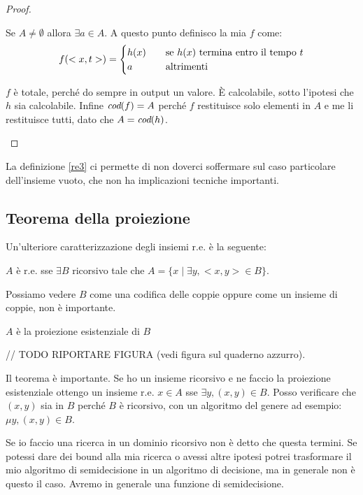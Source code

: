 \begin{proof}
\begin{itemize}
        Se $A \not= \emptyset$ allora $\exists a \in A$. A questo punto definisco la mia $f$ come:
        \begin{equation*}
            f(<x,t>) = 
            \begin{cases}
                h(x) \quad &\text{se $h(x)$ termina entro il tempo $t$}\\
                a \quad &\text{altrimenti}
            \end{cases}
        \end{equation*}

        $f$ è totale, perché do sempre in output un valore. È calcolabile, sotto l'ipotesi che $h$
        sia calcolabile. Infine $\textit{cod}(f) = A$ perché $f$ restituisce solo elementi in $A$ e me li
        restituisce tutti, dato che $A = \textit{cod}(h)$.
    \end{itemize}
\end{proof}


La definizione \eqref{re3} ci permette di non doverci soffermare sul caso particolare dell'insieme
vuoto, che non ha implicazioni tecniche importanti.

\subsection{Teorema della proiezione}

Un'ulteriore caratterizzazione degli insiemi r.e. è la seguente:

\begin{thm}
    $A$ è r.e. sse $\exists B$ ricorsivo tale che $A = \{x \mid \exists y, <x,y> \in B\}$.
\end{thm}

Possiamo vedere $B$ come una codifica delle coppie oppure come un insieme di coppie, non è
importante.

$A$ è la proiezione esistenziale di $B$ 

// TODO RIPORTARE FIGURA
(vedi figura sul quaderno azzurro).

Il teorema è importante. Se ho un insieme ricorsivo e ne faccio la proiezione esistenziale ottengo
un insieme r.e. $x \in A$ sse $\exists y, (x,y) \in B$. Posso verificare che $(x,y)$ sia in $B$
perché $B$ è ricorsivo, con un algoritmo del genere ad esempio: $\mu y, (x,y) \in B$.

Se io faccio una ricerca in un dominio ricorsivo non è detto che questa termini. Se potessi dare dei
bound alla mia ricerca o avessi altre ipotesi potrei trasformare il mio algoritmo di semidecisione
in un algoritmo di decisione, ma in generale non è questo il caso. Avremo in generale una funzione
di semidecisione.

